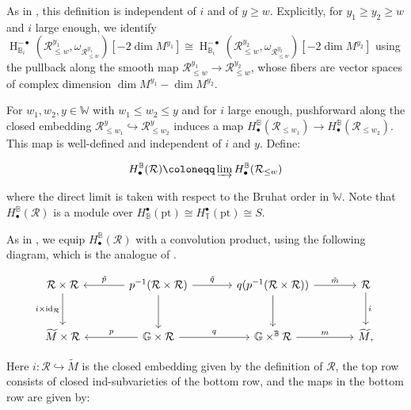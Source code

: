 \documentclass[11pt]{article}
\newcommand{\R}{\mathcal{R}}
\newcommand{\bbG}{\mathbb{G}}
\newcommand{\bbB}{\mathbb{B}}
\newcommand{\1}{\mathbb{1}}
\newcommand{\tW}{\mathbb{W}}
\newcommand{\tT}{\mathbb{T}}
\newcommand{\HBM}[2]{H_\bullet^{#1}(#2)}
\newcommand{\tM}{\widetilde{M}}
\newcommand{\pt}{\text{pt}}
\theoremstyle{definition}
\numberwithin{equation}{section}
\begin{document}
\noindent As in \cite{BFN}, this definition is independent of $i$ and of $y\geq w$. Explicitly, for $y_1\geq y_2\geq w$ and $i$ large enough, we identify $\operatorname{H}^{-\bullet}_{\bbB_i} (\R^{y_1}_{\leq w}, \omega_{\R^{y_1}_{\leq w}})[-2 \dim M^{y_1}] \cong \operatorname{H}^{-\bullet}_{\bbB_i} (\R^{y_2}_{\leq w}, \omega_{\R^{y_2}_{\leq w}})[-2 \dim M^{y_2}]$ using the pullback along the smooth map $\R^{y_1}_{\leq w} \rightarrow \R^{y_2}_{\leq w}$, whose fibers are vector spaces of complex dimension $\dim M^{y_1} - \dim M^{y_2}$.

For $w_1, w_2, y \in \tW$ with $w_1 \leq w_2 \leq y$ and for $i$ large enough, pushforward along the closed embedding $\R^y_{\leq w_1} \hookrightarrow \R^y_{\leq w_2}$ induces a map $\HBM{\bbB}{\R_{\leq w_1}} \rightarrow \HBM{\bbB}{\R_{\leq w_2}}$. This map is well-defined and independent of $i$ and $y$. Define:

\begin{equation}
\label{affine_def_H(R)}
\HBM{\bbB}{\R} \coloneqq \varinjlim \HBM{\bbB}{\R_{\leq w}}
\end{equation}

\noindent where the direct limit is taken with respect to the Bruhat order in $\tW$. Note that $\HBM{\bbB}{\R}$ is a module over $H_\bbB^\bullet(\pt) \cong H_{\tT}^\bullet(\pt) \cong S$.

As in \cite[(iii)]{BFN}, we equip $\HBM{\bbB}{\R}$ with a convolution product, using the following diagram, which is the analogue of \cite[(3.2)]{BFN}.

\begin{equation}
\label{affine_diagram_R_product}
\begin{tikzcd}[column sep=large, row sep=large]
\mathcal{R} \times \mathcal{R} \arrow[d, "i \times \text{id}_{\mathcal{R}}"{left}] & p^{-1}(\mathcal{R} \times \mathcal{R}) \arrow[l, "\tilde{p}"{above}] \arrow[r, "\tilde{q}"] \arrow[d] & q(p^{-1}(\mathcal{R} \times \mathcal{R})) \arrow[r, "\tilde{m}"] \arrow[d] & \mathcal{R} \arrow[d, "i"] \\
\tM \times \mathcal{R} & 
\bbG \times \mathcal{R} \arrow[l, "p"{above}] \arrow[r, "q"{above}] & 
\bbG \times^\bbB \mathcal{R} \arrow[r, "m"{above}] & 
\tM,
\end{tikzcd}
\end{equation}

Here $i:\R \hookrightarrow \tM$ is the closed embedding given by the definition of $\R$, the top row consists of closed ind-subvarieties of the bottom row, and the maps in the bottom row are given by:
\end{document}
